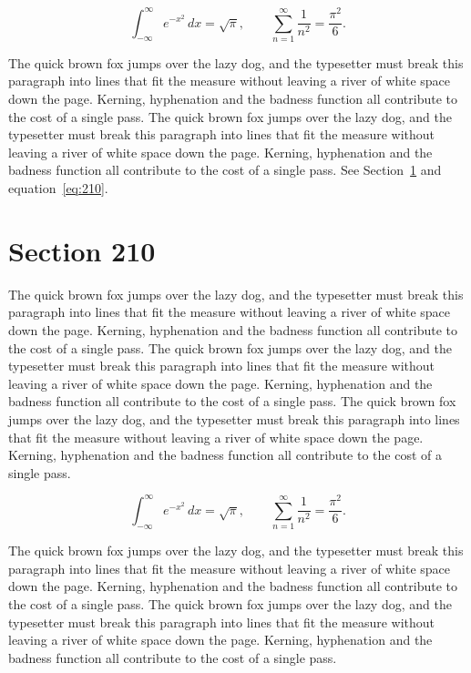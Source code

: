 \documentclass{article}
\begin{document}
\begin{equation}\label{eq:209}
\int_{-\infty}^{\infty} e^{-x^{2}}\,dx = \sqrt{\pi}, \qquad
\sum_{n=1}^{\infty} \frac{1}{n^{2}} = \frac{\pi^{2}}{6}.
\end{equation}

The quick brown fox jumps over the lazy dog, and the typesetter must break this paragraph into lines that fit the measure without leaving a river of white space down the page. Kerning, hyphenation and the badness function all contribute to the cost of a single pass. The quick brown fox jumps over the lazy dog, and the typesetter must break this paragraph into lines that fit the measure without leaving a river of white space down the page. Kerning, hyphenation and the badness function all contribute to the cost of a single pass. 
See Section~\ref{sec:210} and equation~\eqref{eq:210}.
\section{Section 210}
\label{sec:210}
The quick brown fox jumps over the lazy dog, and the typesetter must break this paragraph into lines that fit the measure without leaving a river of white space down the page. Kerning, hyphenation and the badness function all contribute to the cost of a single pass. The quick brown fox jumps over the lazy dog, and the typesetter must break this paragraph into lines that fit the measure without leaving a river of white space down the page. Kerning, hyphenation and the badness function all contribute to the cost of a single pass. The quick brown fox jumps over the lazy dog, and the typesetter must break this paragraph into lines that fit the measure without leaving a river of white space down the page. Kerning, hyphenation and the badness function all contribute to the cost of a single pass. 

\begin{equation}\label{eq:210}
\int_{-\infty}^{\infty} e^{-x^{2}}\,dx = \sqrt{\pi}, \qquad
\sum_{n=1}^{\infty} \frac{1}{n^{2}} = \frac{\pi^{2}}{6}.
\end{equation}

The quick brown fox jumps over the lazy dog, and the typesetter must break this paragraph into lines that fit the measure without leaving a river of white space down the page. Kerning, hyphenation and the badness function all contribute to the cost of a single pass. The quick brown fox jumps over the lazy dog, and the typesetter must break this paragraph into lines that fit the measure without leaving a river of white space down the page. Kerning, hyphenation and the badness function all contribute to the cost of a single pass. 
\end{document}
